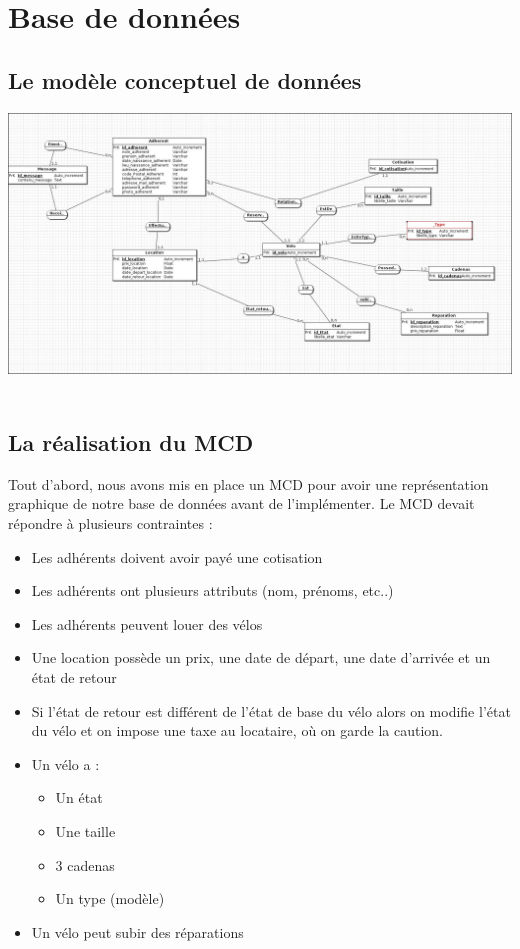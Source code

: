 \documentclass[11pt,a4paper,titlepage]{report}
\begin{document}
\chapter{Base de données}
\section{Le modèle conceptuel de données}
\begin{center}
\includegraphics[width=1\textwidth]{MCD.jpg}~
\end{center}

\section{La réalisation du MCD}

Tout d'abord, nous avons mis en place un MCD pour avoir une représentation graphique de notre base de données avant de l'implémenter.
Le MCD devait répondre à plusieurs contraintes :
\begin{itemize}
\item Les adhérents doivent avoir payé une cotisation
\item Les adhérents ont plusieurs attributs (nom, prénoms, etc..)
\item Les adhérents peuvent louer des vélos 
\item Une location possède un prix, une date de départ, une date d'arrivée et un état de retour
\item Si l'état de retour est différent de l'état de base du vélo alors on modifie l'état du vélo et on impose une taxe au locataire, où on garde la caution.
\item Un vélo a : 
\begin{itemize}
\item Un état
\item Une taille
\item 3 cadenas
\item Un type (modèle)
\end{itemize}
\item Un vélo peut subir des réparations
\end{itemize}
\end{document}

